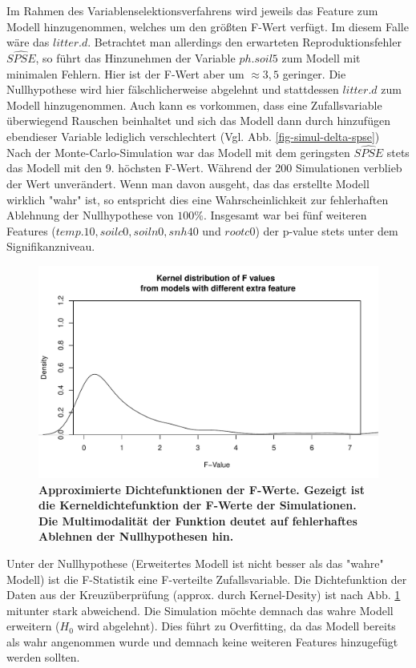 Im Rahmen des Variablenselektionsverfahrens wird jeweils das Feature zum Modell hinzugenommen, welches um den größten F-Wert verfügt.
Im diesem Falle wäre das $litter.d$.
Betrachtet man allerdings den erwarteten Reproduktionsfehler $\widehat{SPSE}$, so führt das Hinzunehmen der Variable $ph.soil5$ zum Modell mit minimalen Fehlern.
Hier ist der F-Wert aber um $\approx 3,5$ geringer.
Die Nullhypothese wird hier fälschlicherweise abgelehnt und stattdessen $litter.d$ zum Modell hinzugenommen.
Auch kann es vorkommen, dass eine Zufallsvariable überwiegend Rauschen beinhaltet und sich das Modell dann durch hinzufügen ebendieser Variable lediglich verschlechtert (Vgl. Abb. \ref{fig-simul-delta-spse})
\\
Nach der Monte-Carlo-Simulation war das Modell mit dem geringsten $\widehat{SPSE}$ stets das Modell mit den 9. höchsten F-Wert.
Während der 200 Simulationen verblieb der Wert unverändert.
Wenn man davon ausgeht, das das erstellte Modell wirklich "wahr" ist, so entspricht dies eine Wahrscheinlichkeit zur fehlerhaften Ablehnung der Nullhypothese von $100\%$.
Insgesamt war bei fünf weiteren Features ($temp.10, soilc0, soiln0, snh40$ und $ rootc0$) der p-value stets unter dem Signifikanzniveau.
\\
\begin{figure}[htbp]
	\centering
	\includegraphics[width=\textwidth]{fig/simul/kernel.pdf}
	\caption{\bf{Approximierte Dichtefunktionen der F-Werte.} 
		Gezeigt ist die Kerneldichtefunktion der F-Werte der Simulationen.
		Die Multimodalität der Funktion deutet auf fehlerhaftes Ablehnen der Nullhypothesen hin.
	}
	\label{fig-simul-kernel}
\end{figure}

Unter der Nullhypothese (Erweitertes Modell ist nicht besser als das "wahre" Modell) ist die F-Statistik eine F-verteilte Zufallsvariable.
Die Dichtefunktion der Daten aus der Kreuzüberprüfung (approx. durch Kernel-Desity) ist nach Abb. \ref{fig-simul-kernel} mitunter stark abweichend.
Die Simulation möchte demnach das wahre Modell erweitern ($H_0$ wird abgelehnt).
Dies führt zu Overfitting, da das Modell bereits als wahr angenommen wurde und demnach keine weiteren Features hinzugefügt werden sollten.

